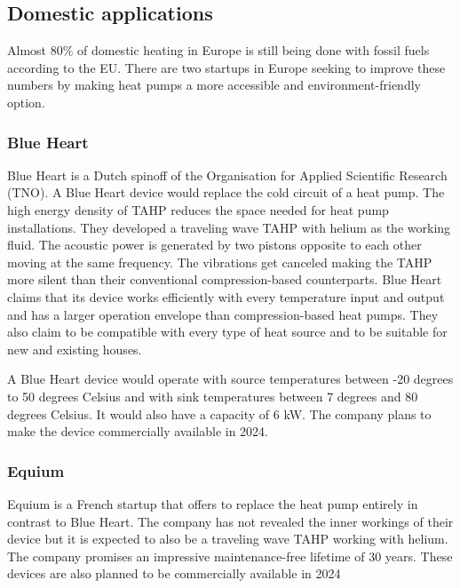 \documentclass[a4paper]{article}
\newcommand{\newpara}
    {
      \bigbreak{}
      \noindent
    }
\begin{document}
\subsection{Domestic applications}
Almost 80\% of domestic heating in Europe is still being done with fossil fuels according to the EU\cite{EU}. There are two startups in Europe seeking to improve these numbers by making heat pumps a more accessible and environment-friendly option.
\subsubsection{Blue Heart\cite{blueheart}}
Blue Heart is a Dutch spinoff of the Organisation for Applied Scientific Research (TNO). A Blue Heart device would replace the cold circuit of a heat pump. The high energy density of TAHP reduces the space needed for heat pump installations. They developed a traveling wave TAHP with helium as the working fluid. The acoustic power is generated by two pistons opposite to each other moving at the same frequency. The vibrations get canceled making the TAHP more silent than their conventional compression-based counterparts. Blue Heart claims that its device works efficiently with every temperature input and output and has a larger operation envelope than compression-based heat pumps. They also claim to be compatible with every type of heat source and to be suitable for new and existing houses.
\newpara{}
A Blue Heart device would operate with source temperatures between -20 degrees to 50 degrees Celsius and with sink temperatures between 7 degrees and 80 degrees Celsius. It would also have a capacity of 6 kW. The company plans to make the device commercially available in 2024.
\subsubsection{Equium\cite{equium}}
Equium is a French startup that offers to replace the heat pump entirely in contrast to Blue Heart. The company has not revealed the inner workings of their device but it is expected to also be a traveling wave TAHP working with helium. The company promises an impressive maintenance-free lifetime of 30 years. These devices are also planned to be commercially available in 2024
\end{document}
